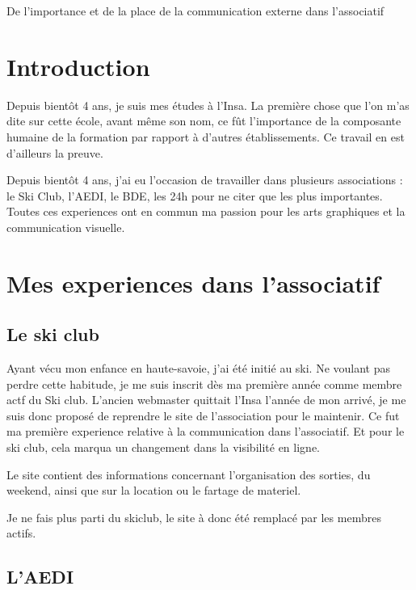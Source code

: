 De l'importance et de la place de la communication externe dans l'associatif


\section {Introduction}

    Depuis bientôt 4 ans, je suis mes études à l'Insa.
    La première chose que l'on m'as dite sur cette école, avant même son nom, ce fût l'importance de la composante humaine de la formation par rapport à d'autres établissements. Ce travail en est d'ailleurs la preuve.

    Depuis bientôt 4 ans, j'ai eu l'occasion de travailler dans plusieurs associations : le Ski Club, l'AEDI, le BDE, les 24h pour ne citer que les plus importantes.
    Toutes ces experiences ont en commun ma passion pour les arts graphiques et la communication visuelle.

\section{Mes experiences dans l'associatif}

    \subsection{Le ski club}
        
        Ayant vécu mon enfance en haute-savoie, j'ai été initié au ski. Ne voulant pas perdre cette habitude, je me suis inscrit dès ma première année comme membre actf du Ski club.
        L'ancien webmaster quittait l'Insa l'année de mon arrivé, je me suis donc proposé de reprendre le site de l'association pour le maintenir.
        Ce fut ma première experience relative à la communication dans l'associatif.
        Et pour le ski club, cela marqua un changement dans la visibilité en ligne.
        
        Le site contient des informations concernant l'organisation des sorties, du weekend, ainsi que sur la location ou le fartage de materiel.
        
        
        Je ne fais plus parti du skiclub, le site à donc été remplacé par les membres actifs.
        
        
    \subsection{L'AEDI}
        
